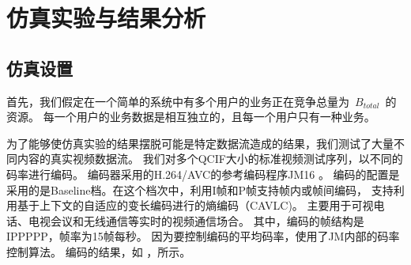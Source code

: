 \section{仿真实验与结果分析}
\subsection{仿真设置}
首先，我们假定在一个简单的系统中有多个用户的业务正在竞争总量为~$B_{total}$~的资源。
每一个用户的业务数据是相互独立的，且每一个用户只有一种业务。

为了能够使仿真实验的结果摆脱可能是特定数据流造成的结果，我们测试了大量不同内容的真实视频数据流。
 我们对多个QCIF大小的标准视频测试序列，以不同的码率进行编码。
编码器采用的H.264/AVC的参考编码程序JM16 \cite{h_264_codec}。
编码的配置是采用的是Baseline档。在这个档次中，利用I帧和P帧支持帧内或帧间编码，
支持利用基于上下文的自适应的变长编码进行的熵编码（CAVLC)。
主要用于可视电话、电视会议和无线通信等实时的视频通信场合\cite{BiHouJie2009}。
其中，编码的帧结构是IPPPPP，帧率为15帧每秒。
因为要控制编码的平均码率，使用了JM内部的码率控制算法。
编码的结果，如 ，所示。
